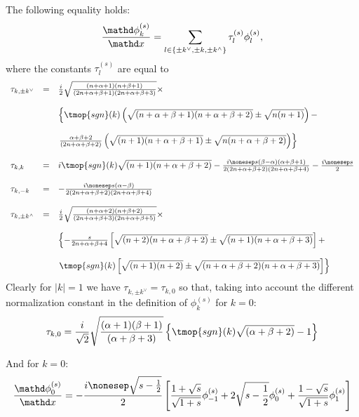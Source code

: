 \begin{theorem}
  \label{thm:stiff-entries}The following equality holds:
  \[ \frac{\mathd \phi_k^{(s)}}{\mathd x} = \sum_{l \in \left\{ \pm k^{\vee},
     \pm k, \pm k^{\wedge} \right\}} \tau_l^{(s)} \phi_l^{(s)}, \]
  where the constants $\tau_l^{(s)}$ are equal to
  \[ \begin{array}{lll}
       \tau_{k, \pm k^{\vee}} & = & \frac{i}{2} \sqrt{\frac{(n + \alpha + 1)
       (n + \beta + 1)}{(2 n + \alpha + \beta + 1) (2 n + \alpha + \beta +
       3)}} \times\\
       &  & \\
       &  & \left\{ \tmop{sgn} (k) \left( \sqrt{(n + \alpha + \beta + 1) (n +
       \alpha + \beta + 2)} \pm \sqrt{n (n + 1)} \right) - \right.\\
       &  & \\
       &  & \left. \frac{\alpha + \beta + 2}{(2 n + \alpha + \beta + 2)}
       \left( \sqrt{(n + 1) (n + \alpha + \beta + 1)} \pm \sqrt{n (n + \alpha
       + \beta + 2)} \right) \right\}\\
       &  & \\
       \tau_{k, k} & = & i \tmop{sgn} (k) \sqrt{(n + 1) (n + \alpha + \beta +
       2)} - \frac{i \nonesep s (\beta - \alpha) (\alpha + \beta + 1)}{2 (2 n
       + \alpha + \beta + 2) (2 n + \alpha + \beta + 4)} - \frac{i \nonesep
       s}{2}\\
       &  & \\
       \tau_{k, - k} & = & - \frac{i \nonesep s (\alpha - \beta)}{2 (2 n +
       \alpha + \beta + 2) (2 n + \alpha + \beta + 4)}\\
       &  & \\
       \tau_{k, \pm k^{\wedge}} & = & \frac{i}{2} \sqrt{\frac{(n + \alpha + 2)
       (n + \beta + 2)}{(2 n + \alpha + \beta + 3) (2 n + \alpha + \beta +
       5)}} \times\\
       &  & \\
       &  & \left\{ - \frac{s}{2 n + \alpha + \beta + 4} \left[ \sqrt{(n + 2)
       (n + \alpha + \beta + 2)} \pm \sqrt{(n + 1) (n + \alpha + \beta + 3)}
       \right] + \right.\\
       &  & \\
       &  & \left. \tmop{sgn} (k) \left[ \sqrt{(n + 1) (n + 2)} \pm \sqrt{(n
       + \alpha + \beta + 2) (n + \alpha + \beta + 3)} \right] \right\}
     \end{array} \]
  Clearly for $|k| = 1$ we have $\tau_{k, \pm k^{\vee}} = \tau_{k, 0}$ so
  that, taking into account the different normalization constant in the
  definition of $\phi_k^{(s)}$ for $k = 0$:
  \[ \tau_{k, 0} = \frac{i}{\sqrt{2}} \sqrt{\frac{(\alpha + 1) (\beta +
     1)}{(\alpha + \beta + 3)}} \left\{ \tmop{sgn} (k) \sqrt{(\alpha + \beta +
     2)} - 1 \right\} \]
  
  
  And for $k = 0$:
  \[ \frac{\mathd \phi_0^{(s)}}{\mathd x} = - \frac{i \nonesep \sqrt{s -
     \frac{1}{2}}}{2} \left[ \frac{1 + \sqrt{s}}{\sqrt{1 + s}} \phi_{-
     1}^{(s)} + 2 \sqrt{s - \frac{1}{2}} \phi_0^{(s)} + \frac{1 -
     \sqrt{s}}{\sqrt{1 + s}} \phi_1^{(s)} \right] \]
\end{theorem}

